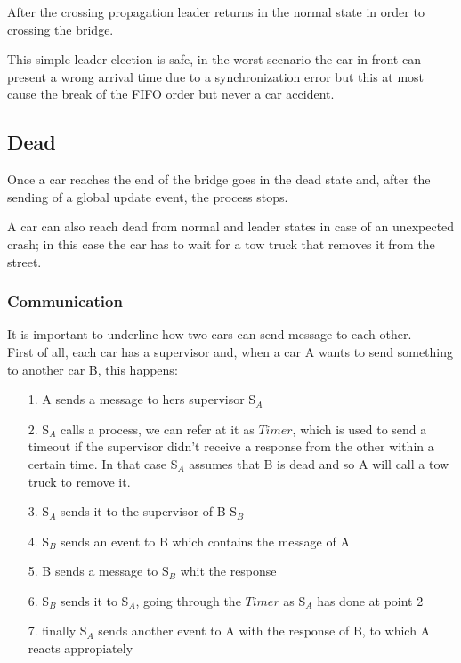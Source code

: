 After the crossing propagation leader returns in the normal state in order to 
crossing the bridge. 

This simple leader election is safe, in the worst scenario 
the car in front can present a wrong arrival time due to a synchronization error 
but this at most cause the break of the FIFO order but never a car accident.


\subsection{Dead}

Once a car reaches the end of the bridge goes in the dead state and, 
after the sending of a global update event, the process stops.

A car can also reach dead from normal and leader states in case of an unexpected 
crash; in this case the car has to wait for a tow truck that removes it from the 
street. 

\subsubsection{Communication}

It is important to underline how two cars can send message to each other. \\
First of all, each car has a supervisor and, when a car A wants to send something to another car B,
this happens:
\begin{itemize}
   \item[1.] A sends a message to hers supervisor S$_{A}$
   \item [2.] S$_{A}$ calls a process, we can refer at it as $Timer$, which is used to send a timeout
   if the supervisor didn't receive a response from the other within a certain time. In that case S$_{A}$ assumes 
   that B is dead and so A will call a tow truck to remove it.
   \item[3.] S$_{A}$ sends it to the supervisor of B S$_{B}$
   \item [4.] S$_{B}$ sends an event to B which contains the message of A
   \item [5.] B sends a message to S$_{B}$ whit the response
   \item [6.] S$_{B}$ sends it to S$_{A}$, going through the $Timer$ as S$_{A}$ has done at point 2
   \item [7.] finally S$_{A}$ sends another event to A with the response of B, to which A reacts appropiately
\end{itemize}

